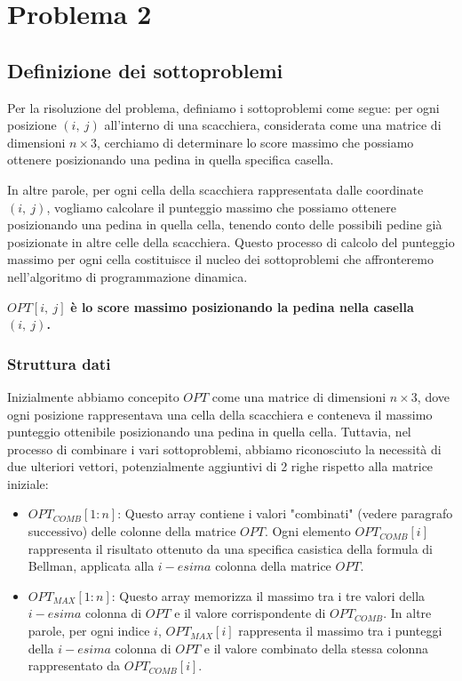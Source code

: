 \section{Problema 2}

\subsection{Definizione dei sottoproblemi}

Per la risoluzione del problema, definiamo i sottoproblemi come segue: per ogni posizione $(i,\ j)$ all'interno di una scacchiera, 
considerata come una matrice di dimensioni $n \times 3$, cerchiamo di determinare lo score massimo che possiamo ottenere posizionando 
una pedina in quella specifica casella.
\newline

In altre parole, per ogni cella della scacchiera rappresentata dalle coordinate $(i,\ j)$, vogliamo calcolare 
il punteggio massimo che possiamo ottenere posizionando una pedina in quella cella, tenendo conto delle possibili pedine 
già posizionate in altre celle della scacchiera. Questo processo di calcolo del punteggio massimo per ogni cella 
costituisce il nucleo dei sottoproblemi che affronteremo nell'algoritmo di programmazione dinamica.

\begin{center}
    $OPT[i,\ j]$ \bf{è lo score massimo posizionando la pedina nella casella} $(i,\ j)$.
\end{center}

\subsubsection*{Struttura dati}

Inizialmente abbiamo concepito $OPT$ come una matrice di dimensioni $n \times 3$, dove ogni posizione rappresentava una cella 
della scacchiera e conteneva il massimo punteggio ottenibile posizionando una pedina in quella cella. 
Tuttavia, nel processo di combinare i vari sottoproblemi, abbiamo riconosciuto la necessità di due ulteriori vettori, 
potenzialmente aggiuntivi di 2 righe rispetto alla matrice iniziale:

\begin{itemize}
    \item $OPT_{COMB}[1:n]$: Questo array contiene i valori "combinati" (vedere paragrafo successivo) delle colonne della matrice $OPT$. Ogni elemento $OPT_{COMB}[i]$ rappresenta il risultato ottenuto da una specifica casistica della formula di Bellman, applicata alla $i-esima$ colonna della matrice $OPT$.
    \item $OPT_{MAX}[1:n]$: Questo array memorizza il massimo tra i tre valori della $i-esima$ colonna di $OPT$ e il valore corrispondente di $OPT_{COMB}$. In altre parole, per ogni indice $i$, $OPT_{MAX}[i]$ rappresenta il massimo tra i punteggi della $i-esima$ colonna di $OPT$ e il valore combinato della stessa colonna rappresentato da $OPT_{COMB}[i]$.
\end{itemize}

